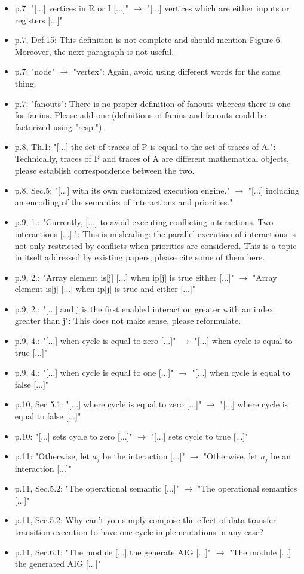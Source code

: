 \begin{itemize}
[...]"
\item p.7: "[...] vertices in R or I [...]" $\rightarrow$ "[...] vertices which are either 
inputs or registers [...]"
\item p.7, Def.15: This definition is not complete and should mention Figure 6. 
Moreover, the next paragraph is not useful.
\item p.7: "node" $\rightarrow$ "vertex": Again, avoid using different words for the same 
thing.
\item p.7: "fanouts": There is no proper definition of fanouts whereas there is 
one for fanins. Please add one (definitions of fanins and fanouts could be 
factorized using "resp.").

\item p.8, Th.1: "[...] the set of traces of P is equal to the set of traces of 
A.": Technically, traces of P and traces of A are different mathematical 
objects, please establish correspondence between the two.

\item p.8, Sec.5: "[...] with its own customized execution engine." $\rightarrow$ "[...] 
including an encoding of the semantics of interactions and priorities."
\item p.9, 1.: "Currently, [...] to avoid executing conflicting interactions. Two 
interactions [...].": This is misleading: the parallel execution of 
interactions is not only restricted by conflicts when priorities are 
considered. This is a topic in itself addressed by existing papers, please 
cite some of them here.
\item p.9, 2.: "Array element is[j] [...] when ip[j] is true either [...]" $\rightarrow$ 
"Array element is[j] [...] when ip[j] is true and either [...]"
\item p.9, 2.: "[...] and j is the first enabled interaction greater with an 
index greater than j": This does not make sense, please reformulate.
\item p.9, 4.: "[...] when cycle is equal to zero [...]" $\rightarrow$ "[...] when cycle is 
equal to true [...]"
\item p.9, 4.: "[...] when cycle is equal to one [...]" $\rightarrow$ "[...] when cycle is 
equal to false [...]"
\item p.10, Sec 5.1: "[...] where cycle is equal to zero [...]" $\rightarrow$ "[...] where 
cycle is equal to false [...]"
\item p.10: "[...] sets cycle to zero [...]" $\rightarrow$ "[...] sets cycle to true [...]"
\item p.11: "Otherwise, let $a_j$ be the interaction [...]" $\rightarrow$ "Otherwise, let $a_j$ 
be an interaction [...]"
\item p.11, Sec.5.2: "The operational semantic [...]" $\rightarrow$ "The operational 
semantics [...]"
\item p.11, Sec.5.2: Why can't you simply compose the effect of data transfer 
transition execution to have one-cycle implementations in any case?
\item p.11, Sec.6.1: "The module [...] the generate AIG [...]" $\rightarrow$ "The module 
[...] the generated AIG [...]"
\end{itemize}
